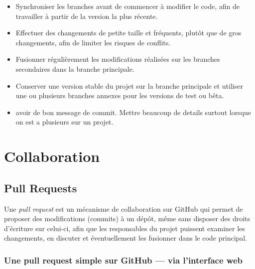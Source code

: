 \documentclass{article}
\begin{document}
\begin{itemize}
    \item Synchroniser les branches avant de commencer à modifier le code, afin de travailler à partir de la version la plus récente.
    \item Effectuer des changements de petite taille et fréquents, plutôt que de gros changements, afin de limiter les risques de conflits.
    \item Fusionner régulièrement les modifications réalisées sur les branches secondaires dans la branche principale.
    \item Conserver une version stable du projet sur la branche principale et utiliser une ou plusieurs branches annexes pour les versions de test ou bêta.
    \item avoir de bon message de commit. Mettre beaucoup de details surtout lorsque on est a plusieurs sur un projet.
\end{itemize}


\section{Collaboration}

\subsection{Pull Requests}

Une \textit{pull request} est un mécanisme de collaboration sur GitHub qui permet de proposer des modifications (commits) à un dépôt, même sans disposer des droits d’écriture sur celui-ci, afin que les responsables du projet puissent examiner les changements, en discuter et éventuellement les fusionner dans le code principal.

\subsubsection{Une pull request simple sur GitHub — via l’interface web}
\end{document}
